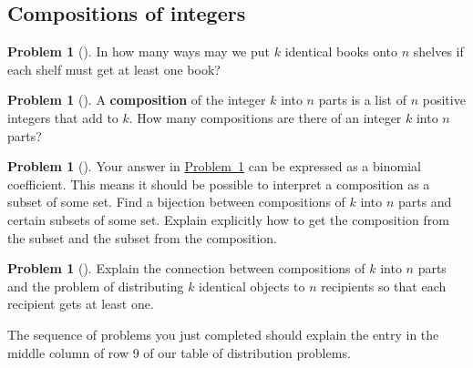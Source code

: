 \documentclass[10pt,]{book}
\newcommand{\terminology}[1]{\textbf{#1}}
\theoremstyle{plain}
\theoremstyle{definition}
\newtheorem{activity}[project]{Problem}
\theoremstyle{definition}
\numberwithin{equation}{chapter}
\newcommand{\importantarrow}{\Rightarrow}
\begin{document}
\subsection[{Compositions of integers}]{Compositions of integers}\label{subsection-31}
\begin{activity}[] \label{activity-129}
In how many ways may we put \(k\) identical books onto \(n\) shelves if each shelf must get at least one book?%
\end{activity}
\begin{activity}[] \label{compositionagian}
A \terminology{composition} of the integer \(k\) into \(n\) parts is a list of \(n\) positive integers that add to \(k\).  How many compositions are there of an integer \(k\) into \(n\) parts?%
\end{activity}
\begin{activity}[]\marginsymbol[-1em]{\pdftooltip{$\importantarrow$}{especially interesting}} \label{activity-131}
Your answer in \hyperref[compositionagian]{Problem~\ref{compositionagian}} can be expressed as a binomial coefficient. This means it should be possible to interpret a composition as a subset of some set. Find a bijection between compositions of \(k\) into \(n\) parts and certain subsets of some set.  Explain explicitly how to get the composition from the subset and the subset from the composition.%
\end{activity}
\begin{activity}[] \label{activity-132}
Explain the connection between compositions of \(k\) into \(n\) parts and the problem of distributing \(k\) identical objects to \(n\) recipients so that each recipient gets at least one.%
\end{activity}
The sequence of problems you just completed should explain the entry in the middle column of row 9 of our table of distribution problems.%
\typeout{************************************************}
\typeout{************************************************}
\end{document}
